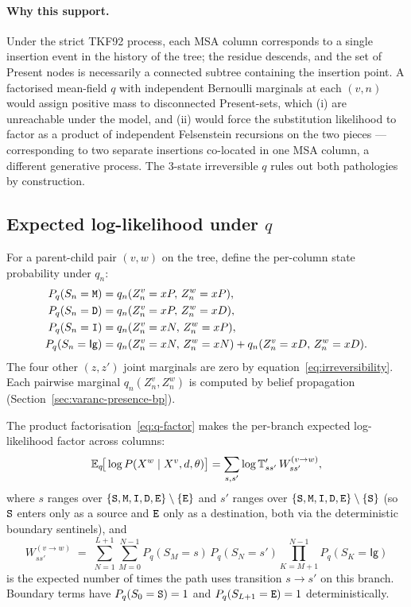 \paragraph{Why this support.}
Under the strict TKF92 process, each MSA column corresponds to a
single insertion event in the history of the tree; the residue
descends, and the set of Present nodes is necessarily a connected
subtree containing the insertion point.
A factorised mean-field $q$ with independent Bernoulli marginals at
each $(v, n)$ would assign positive mass to disconnected
Present-sets, which (i) are unreachable under the model, and
(ii) would force the substitution likelihood to factor as a product
of independent Felsenstein recursions on the two pieces — corresponding
to two separate insertions co-located in one MSA column,
a different generative process.
The 3-state irreversible $q$ rules out both pathologies by
construction.

\subsection{\texorpdfstring{Expected log-likelihood under $q$}{Expected log-likelihood under q}}
\label{sec:varanc-presence-elbo}

For a parent-child pair $(v, w)$ on the tree, define the per-column
state probability under $q_n$:
\begin{align}
\label{eq:column-state-probs}
P_q(S_n = {\tt M})
  &= q_n(Z^v_n = x{P},\, Z^w_n = x{P}), \\
P_q(S_n = {\tt D})
  &= q_n(Z^v_n = x{P},\, Z^w_n = x{D}), \\
P_q(S_n = {\tt I})
  &= q_n(Z^v_n = x{N},\, Z^w_n = x{P}), \\
P_q(S_n = \mathsf{Ig})
  &= q_n(Z^v_n = x{N},\, Z^w_n = x{N})
   + q_n(Z^v_n = x{D},\, Z^w_n = x{D}).
\end{align}
The four other $(z, z')$ joint marginals are zero by
equation~\eqref{eq:irreversibility}.
Each pairwise marginal
$q_n(Z^v_n, Z^w_n)$ is computed by belief propagation
(Section~\ref{sec:varanc-presence-bp}).

The product factorisation~\eqref{eq:q-factor} makes the per-branch
expected log-likelihood factor across columns:
\begin{equation}
\label{eq:E-branch-LL}
\mathbb{E}_q\!\big[\log P(X^w \mid X^v, d, \theta)\big]
= \sum_{s, s'}
   \log \mathbb{T}'_{s s'}\,
   W_{s s'}^{(v \to w)},
\end{equation}
where $s$ ranges over $\{{\tt S},{\tt M},{\tt I},{\tt D},{\tt E}\} \setminus \{{\tt E}\}$ and $s'$ ranges
over $\{{\tt S},{\tt M},{\tt I},{\tt D},{\tt E}\} \setminus \{{\tt S}\}$ (so ${\tt S}$ enters only as a source
and ${\tt E}$ only as a destination, both via the deterministic boundary
sentinels), and
\begin{equation}
\label{eq:W-pair}
W_{s s'}^{(v \to w)}
\;=\;
\sum_{N=1}^{L+1}
\sum_{M=0}^{N-1}
P_q(S_M = s)\,P_q(S_N = s')
\prod_{K=M+1}^{N-1} P_q(S_K = \mathsf{Ig})
\end{equation}
is the expected number of times the path uses transition
$s \to s'$ on this branch.
Boundary terms have $P_q(S_0 = {\tt S}) = 1$ and
$P_q(S_{L+1} = {\tt E}) = 1$ deterministically.

